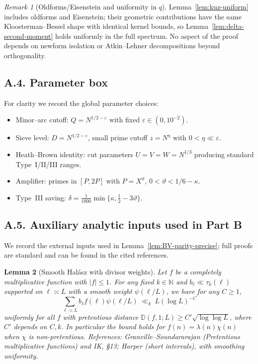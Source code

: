 \documentclass[11pt]{article}
\newtheorem{lemma}{Lemma}[section]
\theoremstyle{definition}
\theoremstyle{remark}
\newtheorem{remark}[lemma]{Remark}
\begin{document}
\begin{remark}[Oldforms/Eisenstein and uniformity in $q$]
	Lemma~\ref{lem:kuz-uniform} includes oldforms and Eisenstein; their geometric contributions have the same Kloosterman–Bessel shape with identical kernel bounds, so Lemma~\ref{lem:delta-second-moment} holds uniformly in the full spectrum. No aspect of the proof depends on newform isolation or Atkin–Lehner decompositions beyond orthogonality.
\end{remark}

\subsection*{A.4. Parameter box}

For clarity we record the global parameter choices:
\begin{itemize}
	\item Minor--arc cutoff: $Q=N^{1/2-\varepsilon}$ with fixed $\varepsilon\in(0,10^{-2})$.
	\item Sieve level: $D=N^{1/2-\varepsilon}$, small prime cutoff $z=N^\eta$ with $0<\eta\ll\varepsilon$.
	\item Heath--Brown identity: cut parameters $U=V=W=N^{1/3}$ producing standard Type~I/II/III ranges.
	\item Amplifier: primes in $[P,2P]$ with $P=X^\vartheta$, $0<\vartheta<1/6-\kappa$.
	\item Type~III saving: $\delta=\tfrac{1}{1000}\min\{\kappa,\tfrac12-3\vartheta\}$.
\end{itemize}
\subsection*{A.5. Auxiliary analytic inputs used in Part B}

We record the external inputs used in Lemma~\ref{lem:BV-parity-precise}; full proofs are standard and can be found in the cited references.

\begin{lemma}[Smooth Hal\'asz with divisor weights]\label{lem:halasz-smooth}
	Let $f$ be a completely multiplicative function with $|f|\le 1$. For any fixed $k\in\mathbb N$ and $b_\ell\ll \tau_k(\ell)$ supported on $\ell\asymp L$ with a smooth weight $\psi(\ell/L)$, we have for any $C\ge 1$,
	\[
		\sum_{\ell\asymp L} b_\ell f(\ell)\psi(\ell/L)\ \ll_{k}\ L(\log L)^{-C}
	\]
	uniformly for all $f$ with pretentious distance $\mathbb D(f,1;L)\ge C'\sqrt{\log\log L}$, where $C'$ depends on $C,k$. In particular the bound holds for $f(n)=\lambda(n)\chi(n)$ when $\chi$ is non-pretentious. References: Granville--Soundararajan (Pretentious multiplicative functions) and IK, §13; Harper (short intervals), with smoothing uniformity.
\end{lemma}
\end{document}
